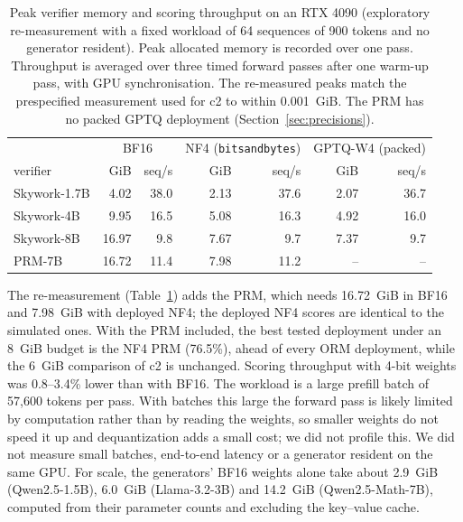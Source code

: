 \begin{table}[!htb]
\centering
\small
\caption{Peak verifier memory and scoring throughput on an RTX 4090 (exploratory
re-measurement with a fixed workload of 64 sequences of 900 tokens and no generator
resident). Peak allocated memory is recorded over one pass. Throughput is averaged over
three timed forward passes after one warm-up pass, with GPU synchronisation. The
re-measured peaks match the prespecified measurement used for c2 to within
0.001~GiB. The PRM has no packed GPTQ deployment (Section~\ref{sec:precisions}).}\label{tab:systems}
\begin{tabular}{lrrrrrr}
\toprule
 & \multicolumn{2}{c}{BF16} & \multicolumn{2}{c}{NF4 (\texttt{bitsandbytes})} & \multicolumn{2}{c}{GPTQ-W4 (packed)} \\
verifier & GiB & seq/s & GiB & seq/s & GiB & seq/s \\
\midrule
Skywork-1.7B & 4.02 & 38.0 & 2.13 & 37.6 & 2.07 & 36.7 \\
Skywork-4B & 9.95 & 16.5 & 5.08 & 16.3 & 4.92 & 16.0 \\
Skywork-8B & 16.97 & 9.8 & 7.67 & 9.7 & 7.37 & 9.7 \\
PRM-7B & 16.72 & 11.4 & 7.98 & 11.2 & -- & -- \\
\bottomrule
\end{tabular}
\end{table}

The re-measurement (Table~\ref{tab:systems}) adds the PRM, which needs 16.72~GiB in
BF16 and 7.98~GiB with deployed NF4; the deployed NF4 scores are identical to the
simulated ones. With the PRM included, the best tested deployment under an 8~GiB budget
is the NF4 PRM (76.5\%), ahead of every ORM deployment, while the 6~GiB comparison of c2
is unchanged. Scoring throughput with 4-bit weights was 0.8--3.4\% lower than with BF16.
The workload is a large prefill batch of 57,600 tokens per pass. With batches this large
the forward pass is likely limited by computation rather than by reading the weights,
so smaller weights do not speed it up and dequantization adds a small cost; we did not
profile this. We did not
measure small batches, end-to-end latency or a generator resident on the same GPU. For
scale, the generators' BF16 weights alone take about 2.9~GiB (Qwen2.5-1.5B), 6.0~GiB
(Llama-3.2-3B) and 14.2~GiB (Qwen2.5-Math-7B), computed from their parameter counts and
excluding the key--value cache.

